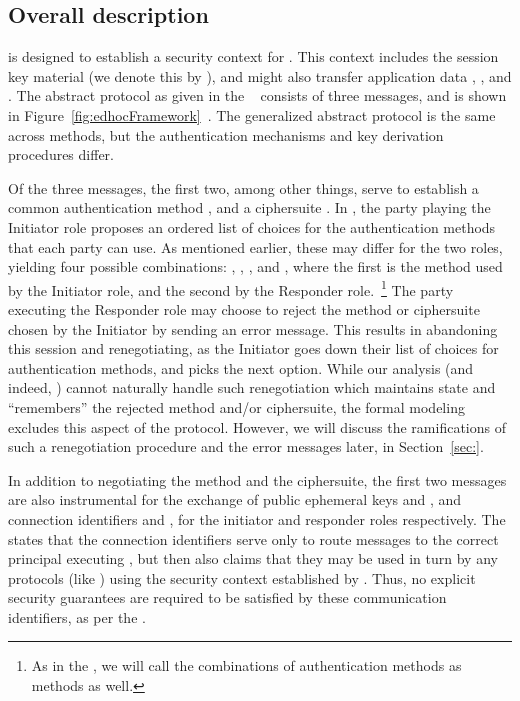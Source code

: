 \subsection{Overall description}
\label{sec:description}
\mEdhoc{} is designed to establish a security context for \mOscore{}.
%
This context includes the session key material (we denote this by \mSessKey{}), and might also transfer application data \mADone{}, \mADtwo{}, and \mADthree{}.
%
The abstract protocol as given in the \mSpec{}~\cite{} consists of three messages, and is shown in Figure~\ref{fig:edhocFramework}~\cite{Norr21}.
%
The generalized abstract protocol is the same across methods, but the authentication mechanisms and key derivation procedures differ.
%

Of the three messages, the first two, among other things, serve to establish a common authentication method \mMethod{}, and a ciphersuite \mSuites{}.
%
In \mMethod{}, the party playing the Initiator role proposes an ordered list of choices for the authentication methods that each party can use. 
%
As mentioned earlier, these may differ for the two roles, yielding four possible combinations: \mSigSig{}, \mSigStat{}, \mStatSig{}, and \mStatStat{}, where the first is the method used by the Initiator role, and the second by the Responder role.~\footnote{As in the \mSpec{}, we will call the combinations of authentication methods as methods as well.}
%
The party executing the Responder role may choose to reject the method or ciphersuite chosen by the Initiator by sending an error message.
%
This results in abandoning this session and renegotiating, as the Initiator goes down their list of choices for authentication methods, and picks the next option.
%
While our analysis (and indeed, \mTamarin{}) cannot naturally handle such renegotiation which maintains state and ``remembers'' the rejected method and/or ciphersuite, the formal modeling excludes this aspect of the protocol. 
%
However, we will discuss the ramifications of such a renegotiation procedure and the error messages later, in Section~\ref{sec:}.
%

In addition to negotiating the method and the ciphersuite, the first two messages are also instrumental for the exchange of public ephemeral keys \mGx{} and \mGy{}, and connection identifiers \mCi{} and \mCr{}, for the initiator and responder roles respectively. 
%
The \mSpec{} states that the connection identifiers serve only to route messages to the correct principal executing \mEdhoc{}, but then also claims that they may be used in turn by any protocols (like \mOscore{}) using the security context established by \mEdhoc{}. 
%
Thus, no explicit security guarantees are required to be satisfied by these communication identifiers, as per the \mSpec{}.


